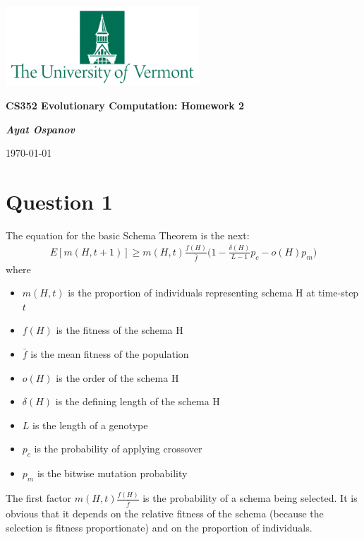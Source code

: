 \documentclass[12pt, a4paper]{article}
\begin{document}
    \begin{center}
        \includegraphics[height=3cm]{UVM}

        {\large\textbf{
            CS352 Evolutionary Computation: Homework 2
        }}

        \vspace{0.3cm}

        \textit{\textbf{Ayat Ospanov}}

        \today
    \end{center}

    \tableofcontents

    \section{Question 1}
        The equation for the basic Schema Theorem is the next:
        \begin{align*}
            E[m(H, t+1)] \geq m(H, t) \frac{f(H)}{\bar{f}} \Big(1 - \frac{\delta(H)}{L - 1}p_c - o(H) p_m\Big)
        \end{align*}
        where
        \begin{itemize}
            \item $m(H, t)$ is the proportion of individuals representing schema H at time-step $t$
            \item $f(H)$ is the fitness of the schema H
            \item $\bar{f}$ is the mean fitness of the population
            \item $o(H)$ is the order of the schema H
            \item $\delta(H)$ is the defining length of the schema H
            \item $L$ is the length of a genotype
            \item $p_c$ is the probability of applying crossover
            \item $p_m$ is the bitwise mutation probability
        \end{itemize}

        The first factor $m(H, t) \frac{f(H)}{\bar{f}}$ is the probability of a
        schema being selected. It is obvious that it depends on the relative fitness
        of the schema (because the selection is fitness proportionate) and on the
        proportion of individuals.
\end{document}
